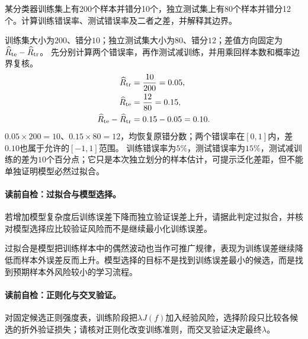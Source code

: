 \label{struct:V1-C10-CH18}
\begin{example}[训练—测试错误率差距]\label{exm:V1-C10-generalization-gap}
某分类器训练集上有200个样本并错分10个，独立测试集上有80个样本并错分12个。计算训练错误率、测试错误率及二者之差，并解释其边界。
\end{example}
\begin{solution}
\SolGiven 训练集大小为$200$、错分$10$；独立测试集大小为$80$、错分$12$；差值方向固定为$\widehat R_{\rm te}-\widehat R_{\rm tr}$。
\SolPlan 先分别计算两个错误率，再作测试减训练，并用乘回样本数和概率边界复核。
\SolDerive
\[
\begin{aligned}
\widehat R_{\rm tr}&=\frac{10}{200}=0.05,\\
\widehat R_{\rm te}&=\frac{12}{80}=0.15,\\
\widehat R_{\rm te}-\widehat R_{\rm tr}&=0.15-0.05=0.10.
\end{aligned}
\]
\SolCheck $0.05\times200=10$、$0.15\times80=12$，均恢复原错分数；两个错误率在$[0,1]$内，差$0.10$也属于允许的$[-1,1]$范围。
\SolAnswer 训练错误率为$5\%$，测试错误率为$15\%$，测试减训练的差为$10$个百分点；它只是本次独立划分的样本估计，可提示泛化差距，但不能单独证明模型必然过拟合。
\end{solution}


\paragraph{读前自检：过拟合与模型选择。}若增加模型复杂度后训练误差下降而独立验证误差上升，请据此判定过拟合，并核对模型选择应比较验证风险而不是继续最小化训练误差。\par

过拟合是模型把训练样本中的偶然波动也当作可推广规律，表现为训练误差继续降低而样本外误差反而上升。模型选择的目标不是找到训练误差最小的候选，而是找到预期样本外风险较小的学习流程。

\paragraph{读前自检：正则化与交叉验证。}对固定候选正则强度表，训练阶段把$\lambda J(f)$加入经验风险，选择阶段只比较各候选的折外验证损失；请核对正则化改变训练准则，而交叉验证决定最终$\lambda$。\par

